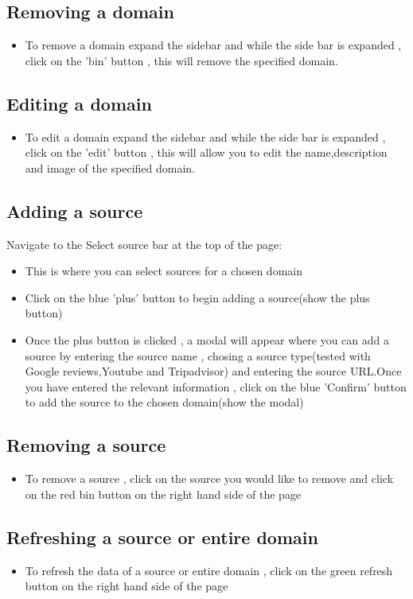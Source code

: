 \documentclass[12pt]{article}
\begin{document}
\subsection{Removing a domain}
\begin{itemize}
    \item To remove a domain expand the sidebar and while the side bar is expanded , click on the 'bin' button , this will remove the specified domain.
\end{itemize}
\subsection{Editing a domain}
\begin{itemize}
    \item To edit a domain expand the sidebar and while the side bar is expanded , click on the 'edit' button , this will allow you to edit the name,description and image of the specified domain.
\end{itemize}
\subsection{Adding a source}
Navigate to the Select source bar at the top of the page:
\begin{itemize}
    \item This is where you can select sources for a chosen domain 
    \item Click on the blue 'plus' button to begin adding a source(show the plus button)
    \item Once the plus button is clicked , a modal will appear where you can add a source by entering the source name , chosing a source type(tested with Google reviews,Youtube and Tripadvisor) and entering the source URL.Once you have entered the relevant information , click on the blue 'Confirm' button to add the source to the chosen domain(show the modal)
\end{itemize}
\subsection{Removing a source}
\begin{itemize}
    \item To remove a source , click on the source you would like to remove and click on the red bin button on the right hand side of the page
\end{itemize}
\subsection{Refreshing a source or entire domain}
\begin{itemize}
    \item To refresh the data of a source or entire domain , click on the green refresh button on the right hand side of the page
\end{itemize}
\end{document}
